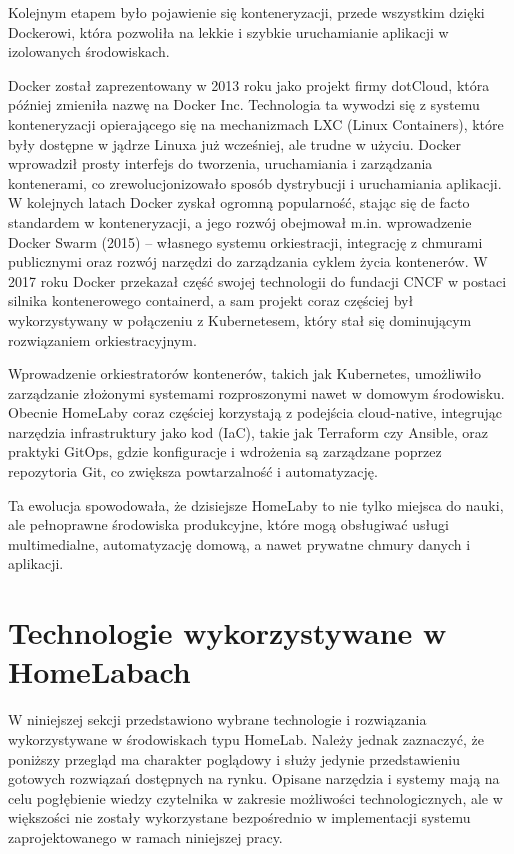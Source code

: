 Kolejnym etapem było pojawienie się konteneryzacji, przede wszystkim dzięki Dockerowi, która pozwoliła na lekkie i szybkie uruchamianie aplikacji w izolowanych środowiskach.

Docker został zaprezentowany w 2013 roku jako projekt firmy dotCloud, która później zmieniła nazwę na Docker Inc. Technologia ta wywodzi się z systemu konteneryzacji opierającego się na mechanizmach LXC (Linux Containers), które były dostępne w jądrze Linuxa już wcześniej, ale trudne w użyciu. Docker wprowadził prosty interfejs do tworzenia, uruchamiania i zarządzania kontenerami, co zrewolucjonizowało sposób dystrybucji i uruchamiania aplikacji. W kolejnych latach Docker zyskał ogromną popularność, stając się de facto standardem w konteneryzacji, a jego rozwój obejmował m.in. wprowadzenie Docker Swarm (2015) – własnego systemu orkiestracji, integrację z chmurami publicznymi oraz rozwój narzędzi do zarządzania cyklem życia kontenerów. W 2017 roku Docker przekazał część swojej technologii do fundacji CNCF w postaci silnika kontenerowego containerd, a sam projekt coraz częściej był wykorzystywany w połączeniu z Kubernetesem, który stał się dominującym rozwiązaniem orkiestracyjnym.

Wprowadzenie orkiestratorów kontenerów, takich jak Kubernetes, umożliwiło zarządzanie złożonymi systemami rozproszonymi nawet w domowym środowisku. Obecnie HomeLaby coraz częściej korzystają z podejścia cloud-native, integrując narzędzia infrastruktury jako kod (IaC), takie jak Terraform czy Ansible, oraz praktyki GitOps, gdzie konfiguracje i wdrożenia są zarządzane poprzez repozytoria Git, co zwiększa powtarzalność i automatyzację.

Ta ewolucja spowodowała, że dzisiejsze HomeLaby to nie tylko miejsca do nauki, ale pełnoprawne środowiska produkcyjne, które mogą obsługiwać usługi multimedialne, automatyzację domową, a nawet prywatne chmury danych i aplikacji.

\section{Technologie wykorzystywane w HomeLabach}

W niniejszej sekcji przedstawiono wybrane technologie i rozwiązania wykorzystywane w środowiskach typu HomeLab. Należy jednak zaznaczyć, że poniższy przegląd ma charakter poglądowy i służy jedynie przedstawieniu gotowych rozwiązań dostępnych na rynku. Opisane narzędzia i systemy mają na celu pogłębienie wiedzy czytelnika w zakresie możliwości technologicznych, ale w większości nie zostały wykorzystane bezpośrednio w implementacji systemu zaprojektowanego w ramach niniejszej pracy.

